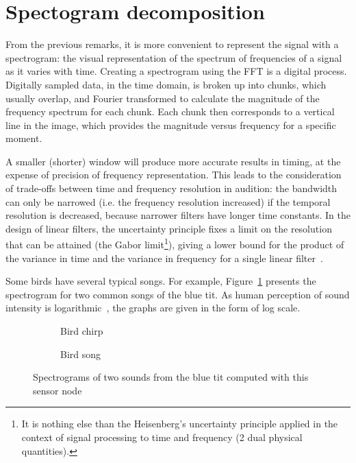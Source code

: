 \documentclass{EPL-master-thesis-covers-EN}
\begin{document}
\section{Spectogram decomposition}

From the previous remarks, it is more convenient to represent the signal with a spectrogram: the visual representation of the spectrum of frequencies of a signal as it varies with time. Creating a spectrogram using the FFT is a digital process. Digitally sampled data, in the time domain, is broken up into chunks, which usually overlap, and Fourier transformed to calculate the magnitude of the frequency spectrum for each chunk. Each chunk then corresponds to a vertical line in the image, which provides the magnitude versus frequency for a specific moment.

A smaller (shorter) window will produce more accurate results in timing, at the expense of precision of frequency representation.
This leads to the consideration of trade-offs between time
and frequency resolution in audition: the bandwidth can only be narrowed (i.e. the frequency resolution increased) if the temporal resolution is decreased, because narrower filters have longer time constants.
In the design of linear filters, the uncertainty principle fixes a
limit on the resolution that can be attained (the Gabor limit\footnote{It is nothing else than the Heisenberg's uncertainty principle applied in the context of signal processing to time and frequency (2 dual physical quantities).}),
giving a lower bound for the product of the variance in time
and the variance in frequency for a single linear filter~\cite{Stowell}.

Some birds have several typical songs. For example, Figure~\ref{fig:blue_tit} presents the spectrogram for two common songs of the blue tit. As human perception of sound intensity is logarithmic~\cite{Psychoacoustics}, the graphs are given in the form of log scale.

\begin{figure}[H]
\begin{subfigure}{.48\textwidth}
  \centering
  
  \caption{Bird chirp}
\end{subfigure}
\begin{subfigure}{.48\textwidth}
  \centering
  
  \caption{Bird song}
\end{subfigure}
\caption{Spectrograms of two sounds from the blue tit computed with this sensor node}
\label{fig:blue_tit}
\end{figure}
\end{document}
